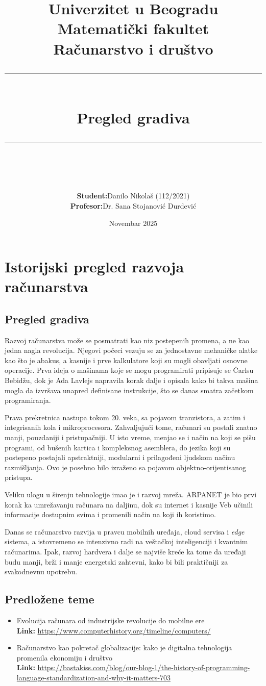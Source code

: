 \documentclass[a4paper,12pt]{article}
\title{%
\sffamily
\Large Univerzitet u Beogradu\\
\large Matematički fakultet\\[0.8em]
\textbf{Računarstvo i društvo}\\[1.2em]
\rule{\linewidth}{0.5pt}\\[0.6em]
\LARGE \textbf{Pregled gradiva}\\
\rule{\linewidth}{0.5pt}\\[1.2em]
}
\author{%
\sffamily
\begin{tabular}{@{}ll@{}}
\textbf{Student:} & Danilo Nikolaš (112/2021) \\
\textbf{Profesor:} & Dr. Sana Stojanović Durdević \\
\end{tabular}
}
\date{\sffamily Novembar 2025}
\begin{document}
\maketitle
\newpage
\tableofcontents
\newpage

\section{Istorijski pregled razvoja računarstva}
\subsection{Pregled gradiva}
Razvoj računarstva može se posmatrati kao niz postepenih promena, a ne kao jedna nagla revolucija. Njegovi počeci vezuju se za jednostavne mehaničke alatke kao što je abakus, a kasnije i prve kalkulatore koji su mogli obavljati osnovne operacije. Prva ideja o mašinama koje se mogu programirati pripisuje se Čarlsu Bebidžu, dok je Ada Lavlejs napravila korak dalje i opisala kako bi takva mašina mogla da izvršava unapred definisane instrukcije, što se danas smatra začetkom programiranja.

Prava prekretnica nastupa tokom 20. veka, sa pojavom tranzistora, a zatim i integrisanih kola i mikroprocesora. Zahvaljujući tome, računari su postali znatno manji, pouzdaniji i pristupačniji. U isto vreme, menjao se i način na koji se pišu programi, od bušenih kartica i kompleksnog asemblera, do jezika koji su postepeno postajali apstraktniji, modularni i prilagođeni ljudskom načinu razmišljanja. Ovo je posebno bilo izraženo sa pojavom objektno-orijentisanog pristupa.

Veliku ulogu u širenju tehnologije imao je i razvoj mreža. ARPANET je bio prvi korak ka umrežavanju računara na daljinu, dok su internet i kasnije Veb učinili informacije dostupnim svima i promenili način na koji ih koristimo.

Danas se računarstvo razvija u pravcu mobilnih uređaja, cloud servisa i \emph{edge} sistema, a istovremeno se intenzivno radi na veštačkoj inteligenciji i kvantnim računarima. Ipak, razvoj hardvera i dalje se najviše kreće ka tome da uređaji budu manji, brži i manje energetski zahtevni, kako bi bili praktičniji za svakodnevnu upotrebu.


\subsection{Predložene teme}
\begin{itemize}
  \item Evolucija računara od industrijske revolucije do mobilne ere \\
  \textbf{Link:} \url{https://www.computerhistory.org/timeline/computers/}
  \item Računarstvo kao pokretač globalizacije: kako je digitalna tehnologija promenila ekonomiju i društvo \\
  \textbf{Link:} \url{https://bastakiss.com/blog/our-blog-1/the-history-of-programming-language-standardization-and-why-it-matters-703}
\end{itemize}
\end{document}

